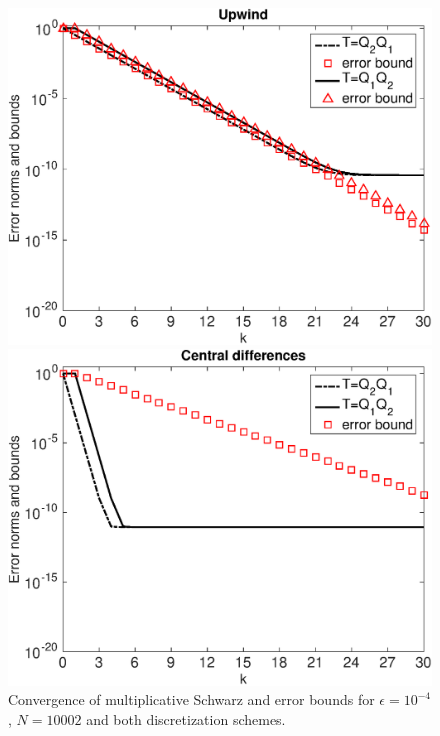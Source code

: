 \begin{figure}[tbhp]
\begin{minipage}[t]{0.49\linewidth}
\includegraphics[width=0.95\linewidth]{figures/mSm_upwind_eps_1e-04_N_10002}
\end{minipage}
%
\begin{minipage}[t]{0.49\linewidth}
\includegraphics[width=0.95\linewidth]{figures/mSm_central_eps_1e-04_N_10002}
\end{minipage}
\caption{Convergence of multiplicative Schwarz and error bounds for
$\epsilon=10^{-4}$, $N=10002$ and both discretization schemes.}
\label{fig:1D:MSM.N10002.eps4}
\end{figure}

